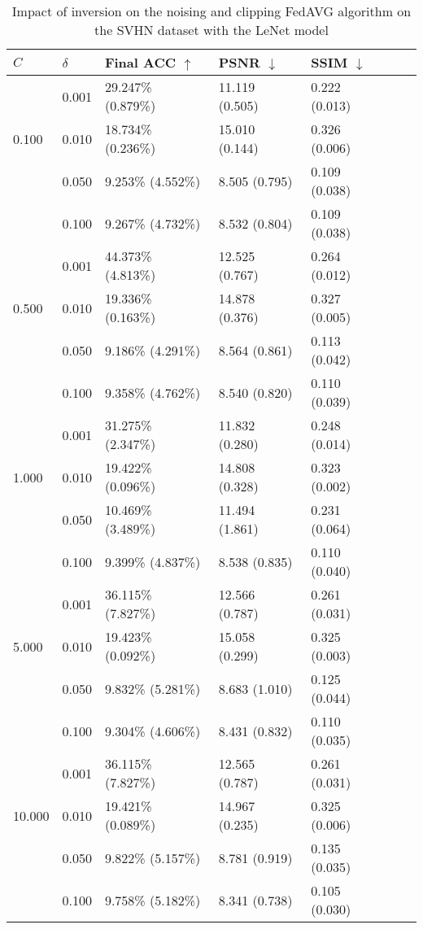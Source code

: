 \documentclass[conference,compsoc]{IEEEtran}
\begin{document}
\begin{table}[H]
\centering
\caption{Impact of inversion on the noising and clipping FedAVG algorithm on the SVHN dataset with the LeNet model}
\label{table:dp_svhn_lenet}
\begin{tabular}{lllllll}
\hline
$C$ & $\delta$ & \textbf{Final ACC} $\uparrow$ & \textbf{PSNR} $\downarrow$ & \textbf{SSIM} $\downarrow$ \\
\hline
\multirow{3}{*}{0.100} & 0.001 & 29.247\% (0.879\%) & 11.119 (0.505) & 0.222 (0.013) \\
& 0.010 & 18.734\% (0.236\%) & 15.010 (0.144) & 0.326 (0.006) \\
& 0.050 & 9.253\% (4.552\%) & 8.505 (0.795) & 0.109 (0.038) \\
& 0.100 & 9.267\% (4.732\%) & 8.532 (0.804) & 0.109 (0.038) \\
\hline
\multirow{3}{*}{0.500} & 0.001 & 44.373\% (4.813\%) & 12.525 (0.767) & 0.264 (0.012) \\
& 0.010 & 19.336\% (0.163\%) & 14.878 (0.376) & 0.327 (0.005) \\
& 0.050 & 9.186\% (4.291\%) & 8.564 (0.861) & 0.113 (0.042) \\
& 0.100 & 9.358\% (4.762\%) & 8.540 (0.820) & 0.110 (0.039) \\
\hline
\multirow{3}{*}{1.000} & 0.001 & 31.275\% (2.347\%) & 11.832 (0.280) & 0.248 (0.014) \\
& 0.010 & 19.422\% (0.096\%) & 14.808 (0.328) & 0.323 (0.002) \\
& 0.050 & 10.469\% (3.489\%) & 11.494 (1.861) & 0.231 (0.064) \\
& 0.100 & 9.399\% (4.837\%) & 8.538 (0.835) & 0.110 (0.040) \\
\hline
\multirow{3}{*}{5.000} & 0.001 & 36.115\% (7.827\%) & 12.566 (0.787) & 0.261 (0.031) \\
& 0.010 & 19.423\% (0.092\%) & 15.058 (0.299) & 0.325 (0.003) \\
& 0.050 & 9.832\% (5.281\%) & 8.683 (1.010) & 0.125 (0.044) \\
& 0.100 & 9.304\% (4.606\%) & 8.431 (0.832) & 0.110 (0.035) \\
\hline
\multirow{3}{*}{10.000} & 0.001 & 36.115\% (7.827\%) & 12.565 (0.787) & 0.261 (0.031) \\
& 0.010 & 19.421\% (0.089\%) & 14.967 (0.235) & 0.325 (0.006) \\
& 0.050 & 9.822\% (5.157\%) & 8.781 (0.919) & 0.135 (0.035) \\
& 0.100 & 9.758\% (5.182\%) & 8.341 (0.738) & 0.105 (0.030) \\
\hline
\end{tabular}
\end{table}
\end{document}

